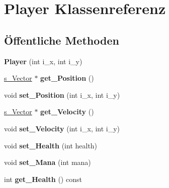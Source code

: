 \hypertarget{class_player}{\section{Player Klassenreferenz}
\label{class_player}
}
\subsection*{Öffentliche Methoden}
\begin{DoxyCompactItemize}
\item 
\hypertarget{class_player_aa87d00dbf49b8d4fa4eb22d1351a7663}{{\bfseries Player} (int i\-\_\-x, int i\-\_\-y)}\label{class_player_aa87d00dbf49b8d4fa4eb22d1351a7663}

\item 
\hypertarget{class_player_a50f12c89f28826db8191f76ed915d788}{\hyperlink{structs___vector}{s\-\_\-\-Vector} $\ast$ {\bfseries get\-\_\-\-Position} ()}\label{class_player_a50f12c89f28826db8191f76ed915d788}

\item 
\hypertarget{class_player_a3615907f803845ff9b37dee94944b09b}{void {\bfseries set\-\_\-\-Position} (int i\-\_\-x, int i\-\_\-y)}\label{class_player_a3615907f803845ff9b37dee94944b09b}

\item 
\hypertarget{class_player_a0b3564dce7078dee4733a2af2460fae1}{\hyperlink{structs___vector}{s\-\_\-\-Vector} $\ast$ {\bfseries get\-\_\-\-Velocity} ()}\label{class_player_a0b3564dce7078dee4733a2af2460fae1}

\item 
\hypertarget{class_player_a12fea44fe4eda565ada463b15443dc56}{void {\bfseries set\-\_\-\-Velocity} (int i\-\_\-x, int i\-\_\-y)}\label{class_player_a12fea44fe4eda565ada463b15443dc56}

\item 
\hypertarget{class_player_a25da073f8c291a56b482d8005b2476d1}{void {\bfseries set\-\_\-\-Health} (int health)}\label{class_player_a25da073f8c291a56b482d8005b2476d1}

\item 
\hypertarget{class_player_af0ddd345e35423723ce460c64cd9a7b6}{void {\bfseries set\-\_\-\-Mana} (int mana)}\label{class_player_af0ddd345e35423723ce460c64cd9a7b6}

\item 
\hypertarget{class_player_a8684c93430c1a9d3827071e00bcdc0d2}{int {\bfseries get\-\_\-\-Health} () const }\label{class_player_a8684c93430c1a9d3827071e00bcdc0d2}


\end{DoxyCompactItemize}
